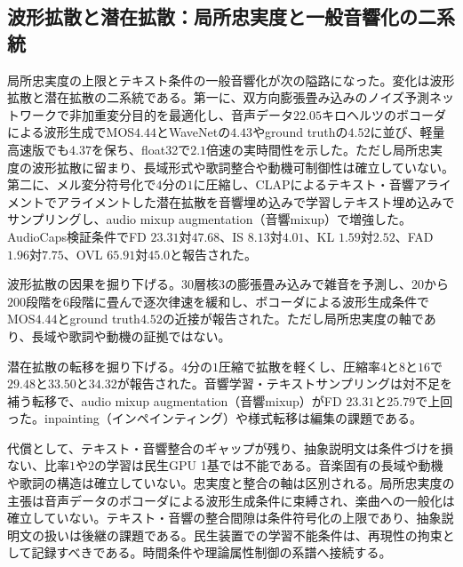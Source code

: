 \documentclass[lualatex,a4paper,10pt]{jlreq}
\begin{document}
\subsection{波形拡散と潜在拡散：局所忠実度と一般音響化の二系統}
局所忠実度の上限とテキスト条件の一般音響化が次の隘路になった\autocite{btd064,btd067}。変化は波形拡散と潜在拡散の二系統である\autocite{btd064,btd067}。第一に、双方向膨張畳み込みのノイズ予測ネットワークで非加重変分目的を最適化し、音声データ$22.05$キロヘルツのボコーダによる波形生成でMOS$4.44$とWaveNetの$4.43$やground truthの$4.52$に並び、軽量高速版でも$4.37$を保ち、float32で$2.1$倍速の実時間性を示した\autocite{btd064}。ただし局所忠実度の波形拡散に留まり、長域形式や歌詞整合や動機可制御性は確立していない\autocite{btd064}。第二に、メル変分符号化で$4$分の$1$に圧縮し、CLAPによるテキスト・音響アライメントでアライメントした潜在拡散を音響埋め込みで学習しテキスト埋め込みでサンプリングし、audio mixup augmentation（音響mixup）で増強した\autocite{btd067}。AudioCaps検証条件でFD $23.31$対$47.68$、IS $8.13$対$4.01$、KL $1.59$対$2.52$、FAD $1.96$対$7.75$、OVL $65.91$対$45.0$と報告された\autocite{btd067}。

波形拡散の因果を掘り下げる。$30$層核$3$の膨張畳み込みで雑音を予測し、$20$から$200$段階を$6$段階に畳んで逐次律速を緩和し、ボコーダによる波形生成条件でMOS$4.44$とground truth$4.52$の近接が報告された\autocite{btd064}。ただし局所忠実度の軸であり、長域や歌詞や動機の証拠ではない\autocite{btd064}。

潜在拡散の転移を掘り下げる。$4$分の$1$圧縮で拡散を軽くし、圧縮率$4$と$8$と$16$で$29.48$と$33.50$と$34.32$が報告された\autocite{btd067}。音響学習・テキストサンプリングは対不足を補う転移で、audio mixup augmentation（音響mixup）がFD $23.31$と$25.79$で上回った\autocite{btd067}。inpainting（インペインティング）や様式転移は編集の課題である\autocite{btd067}。

代償として、テキスト・音響整合のギャップが残り、抽象説明文は条件づけを損ない、比率$1$や$2$の学習は民生GPU 1基では不能である\autocite{btd067}。音楽固有の長域や動機や歌詞の構造は確立していない\autocite{btd067}。忠実度と整合の軸は区別される\autocite{btd064,btd067}。局所忠実度の主張は音声データのボコーダによる波形生成条件に束縛され、楽曲への一般化は確立していない\autocite{btd064}。テキスト・音響の整合間隙は条件符号化の上限であり、抽象説明文の扱いは後継の課題である\autocite{btd067}。民生装置での学習不能条件は、再現性の拘束として記録すべきである\autocite{btd067}。時間条件や理論属性制御の系譜へ接続する\autocite{btd067,btd068}。
\end{document}
